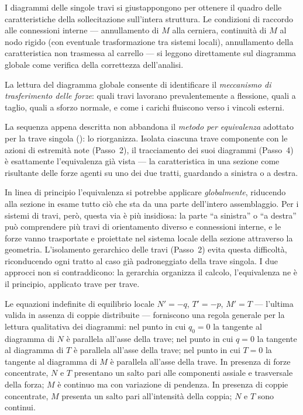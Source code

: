 I diagrammi delle singole travi si giustappongono
per ottenere il quadro delle caratteristiche
della sollecitazione sull'intera struttura.
Le condizioni di raccordo alle connessioni
interne --- annullamento di $M$ alla cerniera,
continuità di $M$ al nodo rigido (con eventuale
trasformazione tra sistemi locali), annullamento
della caratteristica non trasmessa al carrello
--- si leggono direttamente sul diagramma
globale come verifica della correttezza
dell'analisi.

La lettura del diagramma globale consente
di identificare il \emph{meccanismo di
	trasferimento delle forze}: quali travi
lavorano prevalentemente a flessione,
quali a taglio, quali a sforzo normale,
e come i carichi fluiscono verso i vincoli
esterni.

\begin{oss}
	La sequenza appena descritta non abbandona il
	\emph{metodo per equivalenza} adottato per la trave
	singola (): lo riorganizza.
	Isolata ciascuna trave componente con le azioni di
	estremità note (Passo~2), il tracciamento dei suoi
	diagrammi (Passo~4) è esattamente l'equivalenza già
	vista --- la caratteristica in una sezione come
	risultante delle forze agenti su uno dei due tratti,
	guardando a sinistra o a destra.
	
	In linea di principio l'equivalenza si potrebbe
	applicare \emph{globalmente}, riducendo alla sezione
	in esame tutto ciò che sta da una parte dell'intero
	assemblaggio. Per i sistemi di travi, però, questa via
	è più insidiosa: la parte ``a sinistra'' o ``a destra''
	può comprendere più travi di orientamento diverso e
	connessioni interne, e le forze vanno trasportate e
	proiettate nel sistema locale della sezione attraverso
	la geometria. L'isolamento gerarchico delle travi
	(Passo~2) evita questa difficoltà, riconducendo ogni
	tratto al caso già padroneggiato della trave singola.
	I due approcci non si contraddicono: la gerarchia
	organizza il calcolo, l'equivalenza ne è il principio,
	applicato trave per trave.
\end{oss}

\begin{oss}
	Le equazioni indefinite di equilibrio locale
	$N' = -q$, $T' = -p$, $M' = T$ --- l'ultima valida in assenza di coppie distribuite ---
	forniscono una regola generale per la lettura
	qualitativa dei diagrammi: nel punto in cui
	$q_0 = 0$ la tangente al diagramma di $N$
	è parallela all'asse della trave; nel punto
	in cui $q = 0$ la tangente al diagramma di $T$
	è parallela all'asse della trave; nel punto
	in cui $T = 0$ la tangente al diagramma di $M$
	è parallela all'asse della trave.
	In presenza di forze concentrate, $N$ e $T$
	presentano un salto pari alle componenti
	assiale e trasversale della forza; $M$ è
	continuo ma con variazione di pendenza.
	In presenza di coppie concentrate, $M$
	presenta un salto pari all'intensità della
	coppia; $N$ e $T$ sono continui.
\end{oss}

